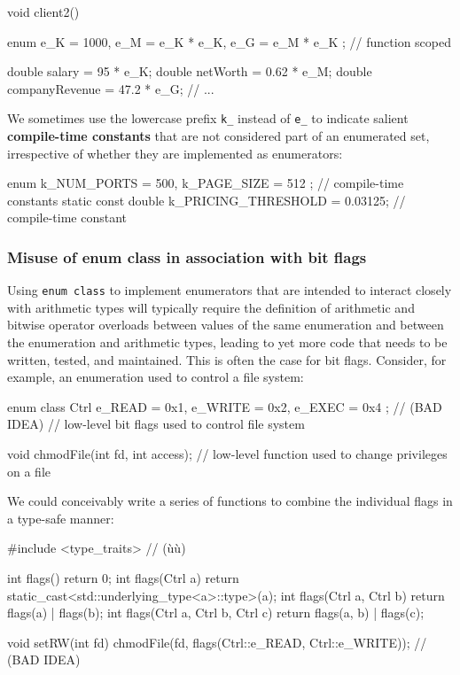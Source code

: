 \begin{emcppslisting}
void client2()
{
    enum { e_K = 1000, e_M = e_K * e_K, e_G = e_M * e_K };  // function scoped

    double salary = 95 * e_K;
    double netWorth = 0.62 * e_M;
    double companyRevenue = 47.2 * e_G;
    // ...
}
\end{emcppslisting}

\noindent We sometimes use the
lowercase prefix \texttt{k\_} instead of \texttt{e\_} to indicate
salient \textbf{compile-time constants} that are not considered part
of an enumerated set, irrespective of whether they are implemented as
enumerators:

\begin{emcppslisting}[basicstyle={\ttfamily\footnotesize}]
enum { k_NUM_PORTS = 500, k_PAGE_SIZE = 512 };     // compile-time constants
static const double k_PRICING_THRESHOLD = 0.03125; // compile-time constant
\end{emcppslisting}

\subsubsection[Misuse of {\tt enum} {\tt class} in association with bit flags]{Misuse of {\SubsubsecCode enum} {\SubsubsecCode class} in association with bit flags}\label{misuse-of-enum-class-in-association-with-bit-flags}

Using \texttt{enum}~\texttt{class} to implement enumerators that are
intended to interact closely with arithmetic types will typically
require the definition of arithmetic and bitwise operator overloads
between values of the same enumeration and between the enumeration and
arithmetic types, leading to yet more code that needs to be written,
tested, and maintained. This is often the case for bit flags. Consider, for example, an
enumeration used to control a file system:

\begin{emcppslisting}
enum class Ctrl { e_READ = 0x1, e_WRITE = 0x2, e_EXEC = 0x4 };  // (BAD IDEA)
    // low-level bit flags used to control file system

void chmodFile(int fd, int access);
    // low-level function used to change privileges on a file
\end{emcppslisting}

\noindent We could conceivably write a series of functions to combine the
individual flags in a type-safe manner:

\begin{emcppslisting}
#include <type_traits>  // (ù{}ù)

int flags() { return 0; }
int flags(Ctrl a) { return static_cast<std::underlying_type<a>::type>(a); }
int flags(Ctrl a, Ctrl b) { return flags(a) | flags(b); }
int flags(Ctrl a, Ctrl b, Ctrl c) { return flags(a, b) | flags(c); }

void setRW(int fd)
{
    chmodFile(fd, flags(Ctrl::e_READ, Ctrl::e_WRITE));  // (BAD IDEA)
}
\end{emcppslisting}

